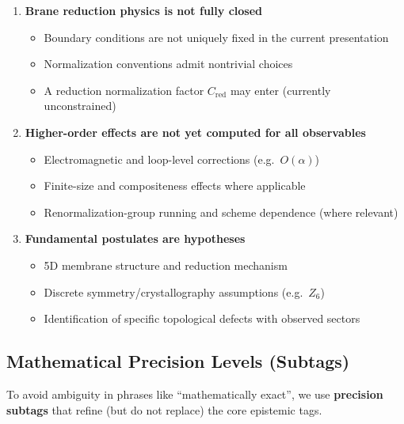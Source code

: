 \begin{enumerate}
\item \textbf{Brane reduction physics is not fully closed}
\begin{itemize}
\item Boundary conditions are not uniquely fixed in the current presentation
\item Normalization conventions admit nontrivial choices
\item A reduction normalization factor $C_{\mathrm{red}}$ may enter (currently unconstrained)
\end{itemize}

\item \textbf{Higher-order effects are not yet computed for all observables}
\begin{itemize}
\item Electromagnetic and loop-level corrections (e.g.\ $O(\alpha)$)
\item Finite-size and compositeness effects where applicable
\item Renormalization-group running and scheme dependence (where relevant)
\end{itemize}

\item \textbf{Fundamental postulates are hypotheses}
\begin{itemize}
\item 5D membrane structure and reduction mechanism \tagP{}
\item Discrete symmetry/crystallography assumptions (e.g.\ $Z_6$) \tagP{}
\item Identification of specific topological defects with observed sectors \tagP{}
\end{itemize}
\end{enumerate}

\subsection*{Mathematical Precision Levels (Subtags)}

To avoid ambiguity in phrases like ``mathematically exact'', we use \textbf{precision subtags}
that refine (but do not replace) the core epistemic tags.


